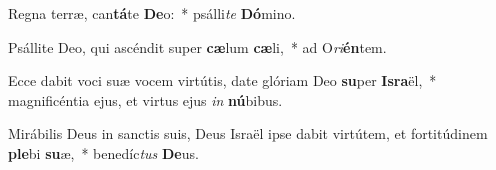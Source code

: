 \item Regna terræ, can\textbf{tá}te \textbf{De}o:~* psálli\textit{te} \textbf{Dó}mino.
\item Psállite Deo, qui ascéndit super \textbf{cæ}lum \textbf{cæ}li,~* ad O\textit{ri}\textbf{én}tem.
\item Ecce dabit voci suæ vocem virtútis, date glóriam Deo \textbf{su}per \textbf{Is}\textbf{ra}ël,~* magnificéntia ejus, et virtus ejus \textit{in} \textbf{nú}bibus.
\item Mirábilis Deus in sanctis suis, Deus Israël ipse dabit virtútem, et fortitúdinem \textbf{ple}bi \textbf{su}æ,~* benedíc\textit{tus} \textbf{De}us.
